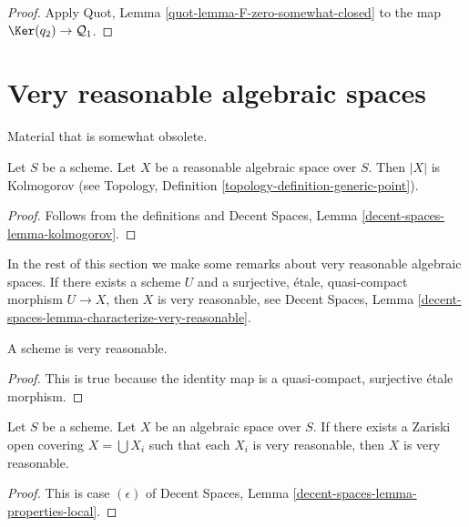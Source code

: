 \begin{proof}
Apply Quot, Lemma \ref{quot-lemma-F-zero-somewhat-closed}
to the map $\Ker(q_2) \to \mathcal{Q}_1$.
\end{proof}








\section{Very reasonable algebraic spaces}
\label{section-very-reasonable}

\noindent
Material that is somewhat obsolete.

\begin{lemma}
\label{lemma-reasonable-kolmogorov}
Let $S$ be a scheme.
Let $X$ be a reasonable algebraic space over $S$.
Then $|X|$ is Kolmogorov (see
Topology, Definition \ref{topology-definition-generic-point}).
\end{lemma}

\begin{proof}
Follows from the definitions and
Decent Spaces, Lemma \ref{decent-spaces-lemma-kolmogorov}.
\end{proof}

\noindent
In the rest of this section we make some remarks about very reasonable
algebraic spaces. If there exists a scheme $U$ and a
surjective, \'etale, quasi-compact
morphism $U \to X$, then $X$ is very reasonable, see
Decent Spaces, Lemma \ref{decent-spaces-lemma-characterize-very-reasonable}.

\begin{lemma}
\label{lemma-scheme-very-reasonable}
A scheme is very reasonable.
\end{lemma}

\begin{proof}
This is true because the identity map is a quasi-compact, surjective
\'etale morphism.
\end{proof}

\begin{lemma}
\label{lemma-very-reasonable-Zariski-local}
Let $S$ be a scheme.
Let $X$ be an algebraic space over $S$.
If there exists a Zariski open covering $X = \bigcup X_i$ such that
each $X_i$ is very reasonable, then $X$ is very reasonable.
\end{lemma}

\begin{proof}
This is case $(\epsilon)$ of
Decent Spaces, Lemma \ref{decent-spaces-lemma-properties-local}.
\end{proof}

